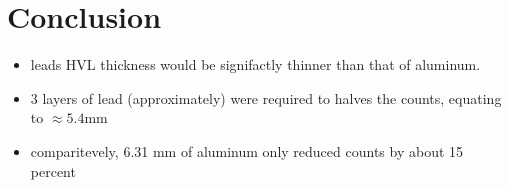 \documentclass[a4paper]{article}
\begin{document}
\section{Conclusion}
\begin{itemize}
    \item leads HVL thickness would be signifactly thinner than that of aluminum.
    \item 3 layers of lead (approximately) were required to halves the counts, equating to $\approx5.4$mm
    \item comparitevely, 6.31 mm of aluminum only reduced counts by about 15 percent
\end{itemize}
\end{document}
